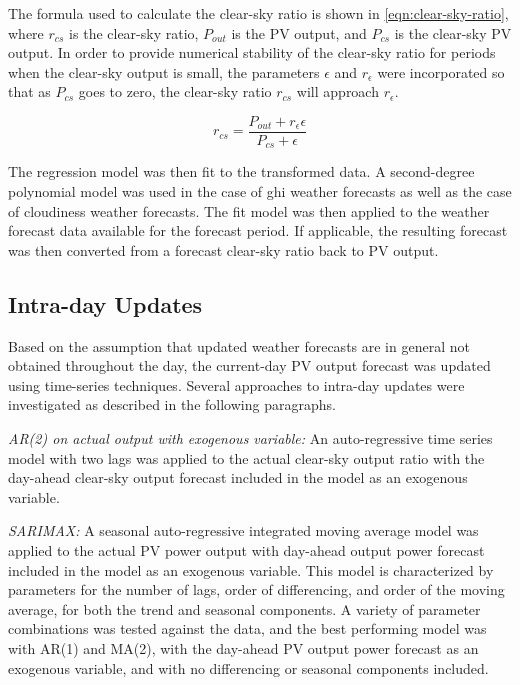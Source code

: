 The formula used to calculate the clear-sky ratio is shown in \cref{eqn:clear-sky-ratio},
where $r_{cs}$ is the clear-sky ratio, $P_{out}$ is the PV output, and $P_{cs}$ is the clear-sky PV output.
In order to provide numerical stability of the clear-sky ratio for periods when the clear-sky output is small, the parameters $\epsilon$ and $r_\epsilon$ were incorporated so that as $P_{cs}$ goes to zero, the clear-sky ratio $r_{cs}$ will approach $r_\epsilon$.

\begin{equation}
	\label{eqn:clear-sky-ratio}
	r_{cs} = \frac{P_{out} + r_\epsilon \epsilon}{P_{cs} + \epsilon}
\end{equation}

The regression model was then fit to the transformed data.
A second-degree polynomial model was used in the case of ghi weather forecasts as well as the case of cloudiness weather forecasts.
The fit model was then applied to the weather forecast data available for the forecast period.
If applicable, the resulting forecast was then converted from a forecast clear-sky ratio back to PV output.

\subsection{Intra-day Updates}
\label{sec:method-intraday}

Based on the assumption that updated weather forecasts are in general not obtained throughout the day, the current-day PV output forecast was updated using time-series techniques. Several approaches to intra-day updates were investigated as described in the following paragraphs.

\textit{AR(2) on actual output with exogenous variable:}
An auto-regressive time series model with two lags was applied to the actual clear-sky output ratio with the day-ahead clear-sky output forecast included in the model as an exogenous variable.

\textit{SARIMAX:}
A seasonal auto-regressive integrated moving average model was applied to the actual PV power output with day-ahead output power forecast included in the model as an exogenous variable.
This model is characterized by parameters for the number of lags, order of differencing, and order of the moving average, for both the trend and seasonal components.
A variety of parameter combinations was tested against the data, and the best performing model was with AR(1) and MA(2), with the day-ahead PV output power forecast as an exogenous variable, and with no differencing or seasonal components included.

